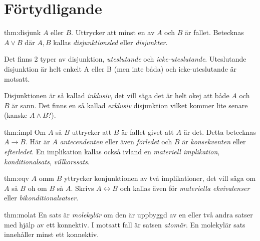 \section{Förtydligande}

\begin{theo}[Disjunktion]{thm:disjunk}
  $A$ eller $B$. Uttrycker att minst en av $A$ och $B$ är fallet. Betecknas $A\vee B$ där $A, B$ kallas \textit{disjunktionsled} eller \textit{disjunkter}.
  \par\bigskip
  \noindent Det finns 2 typer av disjunktion, \textit{uteslutande} och \textit{icke-uteslutande}. Uteslutande disjunktion är helt enkelt A eller B (men inte båda) och icke-uteslutande är motsatt.
\end{theo}
\par\bigskip

\noindent Disjunktionen är så kallad \textit{inklusiv}, det vill säga det är helt okej att både $A$ och $B$ är sann. Det finns en så kallad \textit{exklusiv} disjunktion vilket kommer lite senare (kanske $A\wedge B$?). 
\par\bigskip

\begin{theo}[Implikation]{thm:impl}
  Om $A$ så $B$ uttrycker att $B$ är fallet givet att $A$ är det. Detta betecknas $A\rightarrow B$. Här är $A$ \textit{antecendenten} eller även \textit{förledet} och $B$ är \textit{konsekventen} eller \textit{efterledet}. En implikation kallas också ivland en \textit{materiell implikation}, \textit{konditionalsats}, \textit{villkorssats}.
\end{theo}
\par\bigskip

\begin{theo}[Ekvivalens]{thm:eqv}
  $A$ omm $B$ yttrycker konjunktionen av två implikationer, det vill säga om $A$ så $B$ oh om $B$ så $A$. Skrivs $A\leftrightarrow B$ och kallas även för \textit{materiella ekvivalenser} eller \textit{bikonditionalsatser}.
\end{theo}
\par\bigskip

\begin{theo}{thm:molat}
  En sats är \textit{molekylär} om den är uppbyggd av en eller två andra satser med hjälp av ett konnektiv. I motsatt fall är satsen \textit{atomär}. En molekylär sats innehåller minst ett konnektiv.
\end{theo}
\par\bigskip

